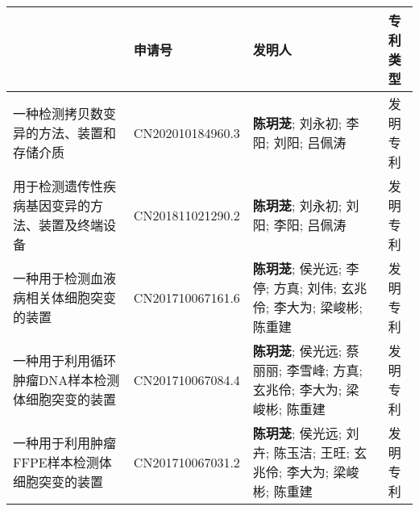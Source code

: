 



\begin{table}[h]

\centering
\tablefont
\begin{tabularx}{\textwidth}{>{\raggedright\arraybackslash}X| X| X| c}
\toprule
{\textbf{专利名称}} & {\textbf{申请号}} & {\textbf{发明人}} & {\textbf{专利类型}} \\
\midrule

一种检测拷贝数变异的方法、装置和存储介质 & CN202010184960.3 & \textbf{陈玥茏}; 刘永初; 李阳; 刘阳; 吕佩涛 & 发明专利 \\
\addlinespace



用于检测遗传性疾病基因变异的方法、装置及终端设备 & CN201811021290.2 & \textbf{陈玥茏}; 刘永初; 刘阳; 李阳; 吕佩涛 & 发明专利\\
\addlinespace



一种用于检测血液病相关体细胞突变的装置 & CN201710067161.6 & \textbf{陈玥茏}; 侯光远; 李停; 方真; 刘伟; 玄兆伶; 李大为; 梁峻彬; 陈重建 & 发明专利\\
\addlinespace

一种用于利用循环肿瘤DNA样本检测体细胞突变的装置 & CN201710067084.4 & \textbf{陈玥茏}; 侯光远; 蔡丽丽; 李雪峰; 方真; 玄兆伶; 李大为; 梁峻彬; 陈重建 &发明专利 \\
\addlinespace

一种用于利用肿瘤FFPE样本检测体细胞突变的装置 & CN201710067031.2 & \textbf{陈玥茏}; 侯光远; 刘卉; 陈玉洁; 王旺; 玄兆伶; 李大为; 梁峻彬; 陈重建 &发明专利 \\
\bottomrule
\end{tabularx}
\end{table}


